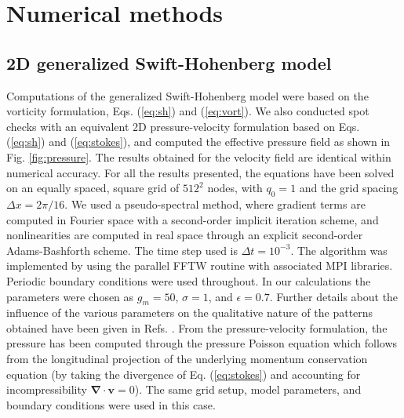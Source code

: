 \documentclass[preprint,prx,floatfix]{revtex4-1}
\begin{document}
\section{Numerical methods}
\label{sec:num}

\subsection{2D generalized Swift-Hohenberg model}
\label{sec:gsh2}

Computations of the generalized Swift-Hohenberg model were based on the vorticity formulation, Eqs. (\ref{eq:sh}) and (\ref{eq:vort}). We also conducted spot checks with an equivalent 2D pressure-velocity formulation based on Eqs. (\ref{eq:sh}) and (\ref{eq:stokes}), and computed the effective pressure field as shown in Fig. \ref{fig:pressure}. The results obtained for the velocity field are identical within numerical accuracy. For all the results presented, the equations have been solved on an equally spaced, square grid of $512^2$ nodes, with $q_0 = 1$ and the grid spacing $\Delta x = 2 \pi/16$. We used a pseudo-spectral method, where gradient terms are computed in Fourier space with a second-order implicit iteration scheme, and nonlinearities are computed in real space through an explicit second-order Adams-Bashforth scheme. The time step used is $\Delta t = 10^{-3}$. The algorithm was implemented by using the parallel FFTW routine with associated MPI libraries. Periodic boundary conditions were used throughout. In our calculations the parameters were chosen as $g_m = 50$, $\sigma = 1$, and $\epsilon = 0.7$. Further details about the influence of the various parameters on the qualitative nature of the patterns obtained have been given in Refs. \cite{cross1996theoretical,karimi2011exploring}. From the pressure-velocity formulation, the pressure has been computed through the pressure Poisson equation which follows from the longitudinal projection of the underlying momentum conservation equation (by taking the divergence of Eq. (\ref{eq:stokes}) and accounting for incompressibility $\bm{\nabla}\cdot \mathbf{v}=0$). The same grid setup, model parameters, and boundary conditions were used in this case.
\end{document}

